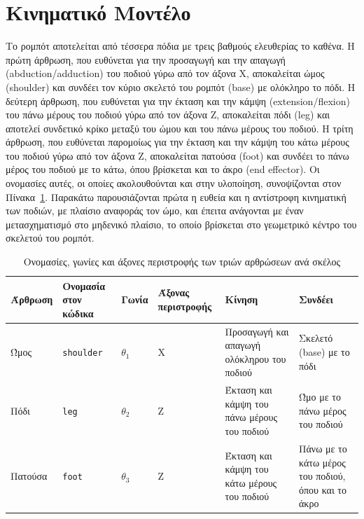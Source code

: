 \documentclass[11pt]{report}
\begin{document}
\section{Κινηματικό Μοντέλο}
Το ρομπότ αποτελείται από τέσσερα πόδια με τρεις βαθμούς ελευθερίας το καθένα.
Η πρώτη άρθρωση, που ευθύνεται για την προσαγωγή και την απαγωγή
(abduction/adduction) του ποδιού
γύρω από τον άξονα X, αποκαλείται ώμος (shoulder) και συνδέει τον κύριο σκελετό
του ρομπότ (base) με ολόκληρο το πόδι. Η δεύτερη άρθρωση, που ευθύνεται για την
έκταση και την κάμψη (extension/flexion) του πάνω μέρους του ποδιού γύρω από τον
άξονα Z,
αποκαλείται πόδι (leg) και αποτελεί συνδετικό κρίκο μεταξύ του ώμου και του
πάνω μέρους του ποδιού. Η τρίτη άρθρωση, που ευθύνεται παρομοίως για την έκταση
και την κάμψη του κάτω μέρους του ποδιού γύρω από τον άξονα Z, αποκαλείται
πατούσα (foot) και συνδέει το πάνω μέρος του ποδιού με το κάτω, όπου βρίσκεται
και το άκρο (end effector). Οι ονομασίες αυτές, οι οποίες ακολουθούνται και
στην υλοποίηση, συνοψίζονται στον Πίνακα~\ref{tab:joint-naming}. Παρακάτω
παρουσιάζονται πρώτα η ευθεία και η αντίστροφη κινηματική των ποδιών, με πλαίσιο
αναφοράς τον ώμο, και έπειτα ανάγονται με έναν μετασχηματισμό στο μηδενικό
πλαίσιο, το οποίο βρίσκεται στο γεωμετρικό κέντρο του σκελετού του ρομπότ.

\begin{table}[htbp]
    \centering
    \small
    \begin{tabular}{@{}p{1.8cm} p{1.8cm} p{1.0cm} p{1.2cm} p{3.8cm} p{3.4cm}@{}}
        \toprule
        Άρθρωση & Ονομασία στον κώδικα & Γωνία & Άξονας περιστροφής & Κίνηση & Συνδέει \\
        \midrule
        Ώμος &
        \texttt{shoulder} &
        $\theta_1$ &
        X &
        Προσαγωγή και απαγωγή ολόκληρου του ποδιού &
        Σκελετό (base) με το πόδι \\
        \midrule
        Πόδι &
        \texttt{leg} &
        $\theta_2$ &
        Z &
        Έκταση και κάμψη του πάνω μέρους του ποδιού &
        Ώμο με το πάνω μέρος του ποδιού \\
        \midrule
        Πατούσα &
        \texttt{foot} &
        $\theta_3$ &
        Z &
        Έκταση και κάμψη του κάτω μέρους του ποδιού &
        Πάνω με το κάτω μέρος του ποδιού, όπου και το άκρο \\
        \bottomrule
    \end{tabular}
    \caption{Ονομασίες, γωνίες και άξονες περιστροφής των τριών αρθρώσεων ανά
    σκέλος}
    \label{tab:joint-naming}
\end{table}
\end{document}

